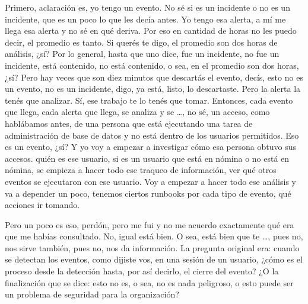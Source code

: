 \begin{description}[leftmargin=0cm, labelsep=0.5cm]
    \item[\textbf{JACUBOVICH LUCIANA:}] Primero, aclaración es, yo tengo un evento. No sé si es un incidente o no es un incidente, que es un poco lo que les decía antes. Yo tengo esa alerta, a mí me llega esa alerta y no sé en qué deriva. Por eso en cantidad de horas no les puedo decir, el promedio es tanto. Si querés te digo, el promedio son dos horas de análisis, ¿sí? Por lo general, hasta que uno dice, fue un incidente, no fue un incidente, está contenido, no está contenido, o sea, en el promedio son dos horas, ¿sí? Pero hay veces que son diez minutos que descartás el evento, decís, esto no es un evento, no es un incidente, digo, ya está, listo, lo descartaste. Pero la alerta la tenés que analizar. Sí, ese trabajo te lo tenés que tomar. Entonces, cada evento que llega, cada alerta que llega, se analiza y se …, no sé, un acceso, como hablábamos antes, de una persona que está ejecutando una tarea de administración de base de datos y no está dentro de los usuarios permitidos. Eso es un evento, ¿sí? Y yo voy a empezar a investigar cómo esa persona obtuvo sus accesos. quién es ese usuario, si es un usuario que está en nómina o no está en nómina, se empieza a hacer todo ese traqueo de información, ver qué otros eventos se ejecutaron con ese usuario. Voy a empezar a hacer todo ese análisis y va a depender un poco, tenemos ciertos runbooks por cada tipo de evento, qué acciones ir tomando.

    \item[\textbf{MUNTAABSKI FEDERICO:}] Pero un poco es eso, perdón, pero me fui y no me acuerdo exactamente qué era que me habías consultado. No, igual está bien. O sea, está bien que te …, pues no, nos sirve también, pues no, nos da información. La pregunta original era: cuando se detectan los eventos, como dijiste vos, en una sesión de un usuario, ¿cómo es el proceso desde la detección hasta, por así decirlo, el cierre del evento? ¿O la finalización que se dice: esto no es, o sea, no es nada peligroso, o esto puede ser un problema de seguridad para la organización?


\end{description}
